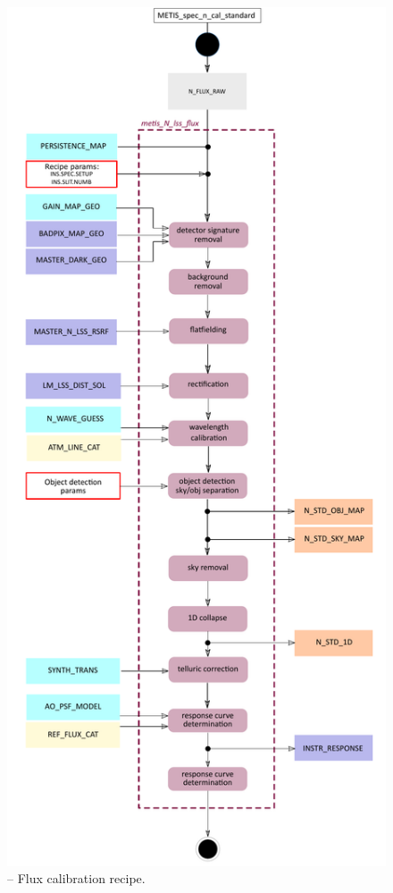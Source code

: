 \begin{figure}[ht]
  \centering
  \includegraphics[width=0.4\textheight]{figures/metis_N_lss_flux_v0.72.pdf}
  \caption[Recipe: ]{ --
    Flux calibration recipe.}
  \label{Fig:rec_N_lss_flux}
\end{figure}
